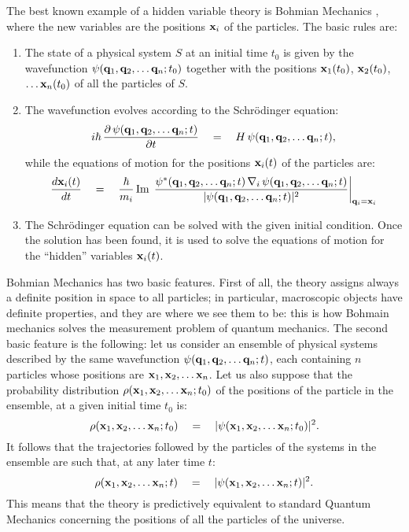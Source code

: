 \documentclass[12pt]{article}
\begin{document}
The best known example of a hidden variable theory is Bohmian
Mechanics \cite{b1,bh,hol,dgz1,dgz2,dgz3}, where the new variables
are the positions ${\bf x}_{i}$ of the particles. The basic rules
are:
\begin{enumerate}
\item The state of a physical system $S$ at an initial time $t_{0}$
is given by the wavefunction $\psi({\bf q}_{1}, {\bf q}_{2},
\ldots {\bf q}_{n}; t_{0})$ together with the positions ${\bf
x}_{1}(t_{0})$, ${\bf x}_{2}(t_{0})$, $\ldots {\bf x}_{n}(t_{0})$
of all the particles of $S$.
\item The wavefunction evolves according to the Schr\"odinger
equation:
\[
i\hbar\, \frac{\partial\,\psi({\bf q}_{1}, {\bf q}_{2}, \ldots
{\bf q}_{n}; t)}{\partial t} \quad = \quad H\, \psi({\bf q}_{1},
{\bf q}_{2}, \ldots {\bf q}_{n}; t),
\]
while the equations of motion for the positions ${\bf x}_{i}(t)$
of the particles are:
\[
\frac{d {\bf x}_{i}(t)}{dt} \quad = \quad \frac{\hbar}{m_{i}}\,
\makebox{Im}\, \left.\frac{\psi^{*}({\bf q}_{1}, {\bf q}_{2},
\ldots {\bf q}_{n}; t)\, {\bf \nabla}_{i}\, \psi({\bf q}_{1}, {\bf
q}_{2}, \ldots {\bf q}_{n}; t)}{|\psi({\bf q}_{1}, {\bf q}_{2},
\ldots {\bf q}_{n}; t)|^{2}}\right|_{{\bf q}_{i} = {\bf x}_{i}}
\]
\item The Schr\"odinger equation can be solved with the given
initial condition. Once the solution has been found, it is used to
solve the equations of motion for the ``hidden'' variables ${\bf
x}_{i}(t)$.
\end{enumerate}

Bohmian Mechanics has two basic features. First of all, the theory
assigns always a definite position in space to all particles; in
particular, macroscopic objects have definite properties, and they
are where we see them to be: this is how Bohmain mechanics solves
the measurement problem of quantum mechanics. The second basic
feature is the following: let us consider an ensemble of physical
systems described by the same wavefunction $\psi({\bf q}_{1}, {\bf
q}_{2}, \ldots {\bf q}_{n}; t)$, each containing $n$ particles
whose positions are ${\bf x}_{1}, {\bf x}_{2}, \ldots {\bf
x}_{n}$. Let us also suppose that the probability distribution
$\rho({\bf x}_{1}, {\bf x}_{2}, \ldots {\bf x}_{n}; t_{0})$ of the
positions of the particle in the ensemble, at a given initial time
$t_{0}$ is:
\[
\rho({\bf x}_{1}, {\bf x}_{2}, \ldots {\bf x}_{n}; t_{0}) \quad =
\quad |\psi({\bf x}_{1}, {\bf x}_{2}, \ldots {\bf x}_{n};
t_{0})|^{2}.
\]
It follows that the trajectories followed by the particles of the
systems in the ensemble are such that, at any later time $t$:
\[
\rho({\bf x}_{1}, {\bf x}_{2}, \ldots {\bf x}_{n}; t) \quad =
\quad |\psi({\bf x}_{1}, {\bf x}_{2}, \ldots {\bf x}_{n}; t)|^{2}.
\]
This means that the theory is predictively equivalent to standard
Quantum Mechanics concerning the positions of all the particles of
the universe.
\end{document}
